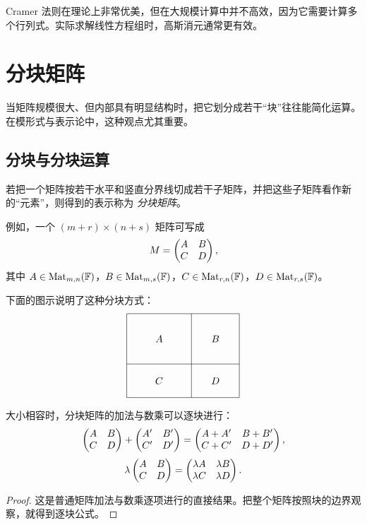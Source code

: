 \begin{remark}
Cramer 法则在理论上非常优美，但在大规模计算中并不高效，因为它需要计算多个行列式。实际求解线性方程组时，高斯消元通常更有效。
\end{remark}

\section{分块矩阵}

当矩阵规模很大、但内部具有明显结构时，把它划分成若干“块”往往能简化运算。在模形式与表示论中，这种观点尤其重要。

\subsection{分块与分块运算}

\begin{definition}
若把一个矩阵按若干水平和竖直分界线切成若干子矩阵，并把这些子矩阵看作新的“元素”，则得到的表示称为 \emph{分块矩阵}。
\end{definition}

例如，一个 $(m+r)\times(n+s)$ 矩阵可写成
\[
M=\begin{pmatrix} A&B\\C&D \end{pmatrix},
\]
其中 $A\in\mathrm{Mat}_{m,n}(\mathbb{F})$，$B\in\mathrm{Mat}_{m,s}(\mathbb{F})$，$C\in\mathrm{Mat}_{r,n}(\mathbb{F})$，$D\in\mathrm{Mat}_{r,s}(\mathbb{F})$。

下面的图示说明了这种分块方式：
\[
\begin{tikzpicture}[baseline=(current bounding box.center)]
  \draw (0,0) rectangle (4,3);
  \draw (0,1.2) -- (4,1.2);
  \draw (2.3,0) -- (2.3,3);
  \node at (1.15,2.1) {$A$};
  \node at (3.15,2.1) {$B$};
  \node at (1.15,0.6) {$C$};
  \node at (3.15,0.6) {$D$};
\end{tikzpicture}
\]

\begin{proposition}[分块加法与数乘]
大小相容时，分块矩阵的加法与数乘可以逐块进行：
\[
\begin{pmatrix} A&B\\C&D \end{pmatrix}+\begin{pmatrix} A'&B'\\C'&D' \end{pmatrix}=
\begin{pmatrix} A+A'&B+B'\\C+C'&D+D' \end{pmatrix},
\]
\[
\lambda\begin{pmatrix} A&B\\C&D \end{pmatrix}=
\begin{pmatrix} \lambda A&\lambda B\\\lambda C&\lambda D \end{pmatrix}.
\]
\end{proposition}

\begin{proof}
这是普通矩阵加法与数乘逐项进行的直接结果。把整个矩阵按照块的边界观察，就得到逐块公式。
\end{proof}

